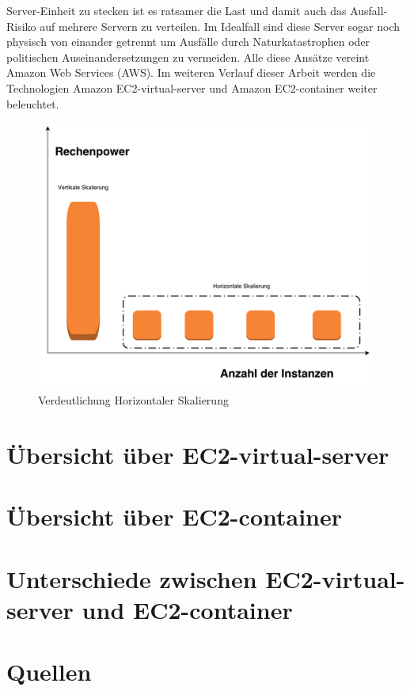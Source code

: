 \documentclass[titlepage]{report}
\begin{document}
Server-Einheit zu stecken ist es ratsamer die Last und damit auch das
Ausfall-Risiko auf mehrere Servern zu verteilen. Im Idealfall sind diese
Server sogar noch physisch von einander getrennt um Ausfälle durch
Naturkatastrophen oder politischen Auseinandersetzungen zu vermeiden.
Alle diese Ansätze vereint Amazon Web Services (AWS). Im weiteren
Verlauf dieser Arbeit werden die Technologien Amazon EC2-virtual-server
und Amazon EC2-container weiter beleuchtet.
\begin{figure}
    \centering
    \includegraphics[width=1.0\textwidth]{figures/scalability.pdf}
    \caption{Verdeutlichung Horizontaler Skalierung}\label{fig:1}
\end{figure}
\newpage
\chapter{Übersicht über EC2-virtual-server}
\newpage
\chapter{Übersicht über EC2-container}
\newpage
\chapter{Unterschiede zwischen EC2-virtual-server und EC2-container}
\newpage
\chapter{Quellen}
\nocite{*}


\listoffigures
\end{document}
